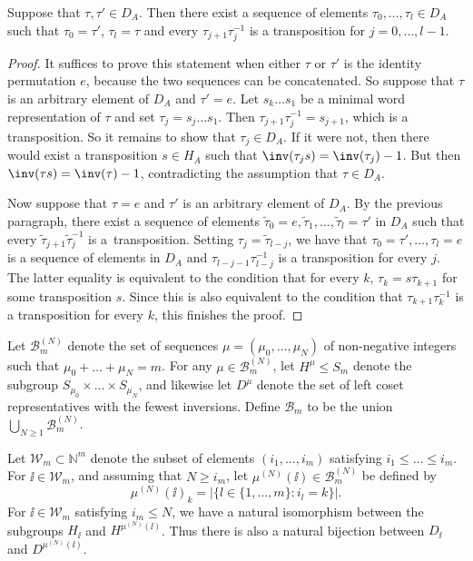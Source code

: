  \begin{Lemma}\label{Gene}
 	Suppose that $\tau,\tau' \in D_A$. Then there exist a sequence of elements $\tau_0,\dots,\tau_l\in D_A$ such that $\tau_0 = \tau'$, $\tau_l=\tau$ and every $\tau_{j+1}\tau_j^{-1}$ is a transposition for $j=0,\dots,l-1$.
 \end{Lemma}
 \begin{proof}
 	It suffices to prove this statement when either $\tau$ or $\tau'$ is the identity permutation $e$, because the two sequences can be concatenated. So suppose that $\tau$ is an arbitrary element of $D_A$ and $\tau'=e$. Let $s_k\dots s_1$ be a minimal word representation of $\tau$ and set $\tau_j = s_j \dots s_1$. Then $\tau_{j+1}\tau_j^{-1}=s_{j+1}$, which is a transposition. So it remains to show that $\tau_j \in D_A$. If it were not, then there would exist a transposition $s\in H_A$ such that $\inv(\tau_js) = \inv(\tau_j)-1$. But then $\inv(\tau s) = \inv(\tau)-1$, contradicting the assumption that $\tau \in D_A$.
 	
 	Now suppose that $\tau=e$ and $\tau'$ is an arbitrary element of $D_A$. By the previous paragraph, there exist a sequence of elements $\tilde{\tau}_0=e,\tilde{\tau}_1,\dots,\tilde{\tau}_l=\tau'$ in $D_A$ such that every $\tilde{\tau}_{j+1}\tilde{\tau}_j^{-1}$ is a~transposition. Setting $\tau_j = \tilde{\tau}_{l-j}$, we have that $\tau_0=\tau',\dots,\tau_l=e$ is a sequence of elements in $D_A$ and ${\tau}_{l-j-1}{\tau}_{l-j}^{-1}$ is a transposition for every $j$. The latter equality is equivalent to the condition that for every $k$, $\tau_k = s\tau_{k+1}$ for some transposition $s$. Since this is also equivalent to the condition that $\tau_{k+1}\tau_k^{-1}$ is a transposition for every $k$, this finishes the proof.
 \end{proof}

 Let $ \mathcal{B}_m^{(N)} $ denote the set of sequences $ \mu=(\mu_0,\dots,\mu_N) $ of non-negative integers such that $ \mu_0+\dots+\mu_N=m $. For any $ \mu \in \mathcal{B}_m^{(N)} $, let $ H^\mu \le S_m$ denote the subgroup $ S_{\mu_0}\times \dots \times S_{\mu_N} $, and likewise let $ D^\mu $ denote the set of left coset representatives with the fewest inversions. Define $\mathcal{B}_m$ to be the union $\bigcup_{N\geq 1} \mathcal{B}_m^{(N)}$.

Let $\mathcal{W}_m \subset \mathbb{N}^m$ denote the subset of elements $(i_1,\dots,i_m)$ satisfying $i_1 \leq \dots \leq i_m$. For $\ii \in \mathcal{W}_m$, and assuming that $N\geq i_m$, let $\mu^{(N)}(\ii) \in \mathcal{B}_m^{(N)}$ be defined by
\[
\mu^{(N)}(\ii)_k = \vert \{ l \in \{1,\dots,m\}\colon i_l=k \} \vert.
\]
For $\ii \in \mathcal{W}_m$ satisfying $i_m \leq N$, we have a natural isomorphism between the subgroups $H_{\ii}$ and $H^{\mu^{(N)}(\ii)}$. Thus there is also a natural bijection between $D_{\ii}$ and $D^{\mu^{(N)}(\ii)}$.

